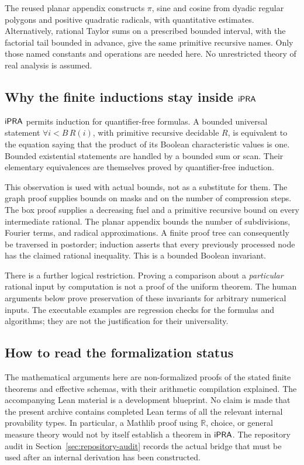 The reused planar appendix constructs \(\pi\), sine and cosine from
dyadic regular polygons and positive quadratic radicals, with quantitative
estimates. Alternatively, rational Taylor sums on a prescribed bounded
interval, with the factorial tail bounded in advance, give the same
primitive recursive names. Only those named constants and operations are
needed here. No unrestricted theory of real analysis is assumed.

\subsection{Why the finite inductions stay inside \(\mathsf{iPRA}\)}

\(\mathsf{iPRA}\) permits induction for quantifier-free formulas. A bounded
universal statement \(\forall i<B\,R(i)\), with primitive recursive
decidable \(R\), is equivalent to the equation saying that the product
of its Boolean characteristic values is one. Bounded existential
statements are handled by a bounded sum or scan. Their elementary
equivalences are themselves proved by quantifier-free induction.

This observation is used with actual bounds, not as a substitute for them.
The graph proof supplies bounds on masks and on the number of compression
steps. The box proof supplies a decreasing fuel and a primitive recursive
bound on every intermediate rational. The planar appendix bounds the
number of subdivisions, Fourier terms, and radical approximations. A
finite proof tree can consequently be traversed in postorder; induction
asserts that every previously processed node has the claimed rational
inequality. This is a bounded Boolean invariant.

There is a further logical restriction. Proving a comparison about a
\emph{particular} rational input by computation is not a proof of the
uniform theorem. The human arguments below prove preservation of these
invariants for arbitrary numerical inputs. The executable examples are
regression checks for the formulas and algorithms; they are not the
justification for their universality.

\subsection{How to read the formalization status}

The mathematical arguments here are non-formalized proofs of the stated
finite theorems and effective schemas, with their arithmetic compilation
explained. The accompanying Lean material is a development blueprint.
No claim is made that the present archive contains completed Lean terms
of all the relevant internal provability types. In particular, a Mathlib
proof using \(\mathbb R\), choice, or general measure theory would not
by itself establish a theorem in \(\mathsf{iPRA}\). The repository audit in
Section~\ref{sec:repository-audit} records the actual bridge that must
be used after an internal derivation has been constructed.

